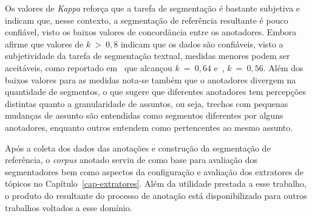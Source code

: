 Os valores de \textit{Kappa} reforça que a tarefa de segmentação é bastante subjetiva e indicam que, nesse contexto, a segmentação de referência resultante é pouco confiável, visto os baixos valores de concordância entre os anotadores. 
Embora~\cite{Carletta1996} afirme que valores de $k~>~0,8$ indicam que os dados são confiáveis, visto a subjetividade da tarefa de segmentação textual, medidas menores podem ser aceitáveis, como reportado em~\cite{Hearst1997} que alcançou $k~=~0,64$ e~\cite{Cardoso2017}, $k~=~0,56$. Além dos baixos valores para as medidas nota-se também que o anotadores divergem na quantidade de segmentos, o que sugere que diferentes anotadores tem percepções distintas quanto a granularidade de assuntos, ou seja, trechos com pequenas mudanças de assunto são entendidas como segmentos diferentes por alguns anotadores, enquanto outros entendem como pertencentes ao mesmo assunto.





Após a coleta dos dados das anotações e construção da segmentação de referência, o \textit{corpus} anotado serviu de como base para avaliação dos segmentadores bem como aspectos da configuração e avaliação dos extratores de tópicos no Capítulo~\ref{cap-extratores}. Além da utilidade prestada a esse trabalho, o produto do resultante do processo de anotação está disponibilizado para outros trabalhos voltados a esse domínio.



